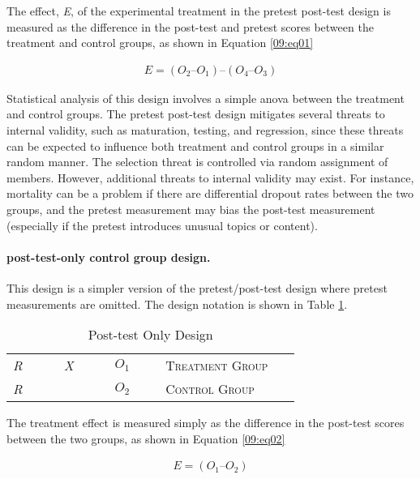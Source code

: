The effect, \textit{E}, of the experimental treatment in the pretest post-test design is measured as the difference in the post-test and pretest scores between the treatment and control groups, as shown in Equation \ref{09:eq01}

\begin{align}
	\label{09:eq01}
	E = (O_2 – O_1) – (O_4 – O_3)
\end{align}

Statistical analysis of this design involves a simple \gls{anova} between the treatment and control groups. The pretest post-test design mitigates several threats to internal validity, such as maturation, testing, and regression, since these threats can be expected to influence both treatment and control groups in a similar random manner. The selection threat is controlled via random assignment of members. However, additional threats to internal validity may exist. For instance, mortality can be a problem if there are differential dropout rates between the two groups, and the pretest measurement may bias the post-test measurement (especially if the pretest introduces unusual topics or content).

\paragraph{post-test-only control group design.} This design is a simpler version of the pretest/post-test design where pretest measurements are omitted. The design notation is shown in Table \ref{09:tab02}.

\begin{table}[H]
	\centering
	\begin{tabularx}{0.90\linewidth}{p{0.15\linewidth}p{0.15\linewidth}p{0.15\linewidth}p{0.40\linewidth}}
		\toprule
		\textit{R} & \textit{X} & $ O_1 $ & \textsc{Treatment Group} \\
		\textit{R} &            & $ O_2 $ & \textsc{Control Group} \\
		\bottomrule
	\end{tabularx}
	\caption{Post-test Only Design}
	\label{09:tab02}
\end{table}

The treatment effect is measured simply as the difference in the post-test scores between the two groups, as shown in Equation \ref{09:eq02}

\begin{align}
	\label{09:eq02}
	E = (O_1 – O_2)
\end{align}

